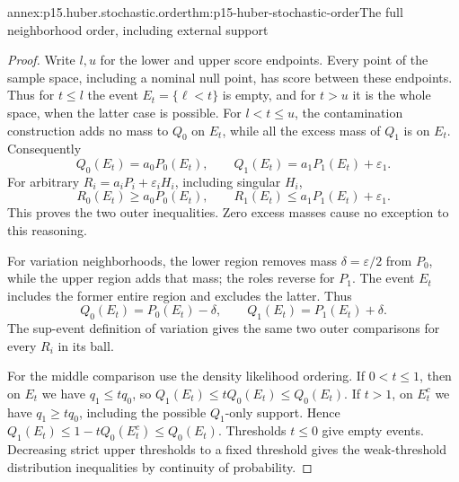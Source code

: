 \begin{annexitem}{annex:p15.huber.stochastic.order}{thm:p15-huber-stochastic-order}{The full neighborhood order, including external support}
\begin{proof}
Write \(l,u\) for the lower and upper score endpoints.
Every point of the sample space, including a nominal null point, has
score between these endpoints. Thus for \(t\leq l\) the event
\(E_t=\{\ell<t\}\) is empty, and for \(t>u\) it is the whole space,
when the latter case is possible.
For \(l<t\leq u\), the contamination construction adds no mass to
\(Q_0\) on \(E_t\), while all the excess mass of \(Q_1\) is on \(E_t\).
Consequently
\[
 Q_0(E_t)=a_0P_0(E_t),\qquad Q_1(E_t)=a_1P_1(E_t)+\varepsilon_1.
\]
For arbitrary \(R_i=a_iP_i+\varepsilon_iH_i\), including singular \(H_i\),
\[
 R_0(E_t)\geq a_0P_0(E_t),\qquad
 R_1(E_t)\leq a_1P_1(E_t)+\varepsilon_1.
\]
This proves the two outer inequalities. Zero excess masses cause no
exception to this reasoning.

For variation neighborhoods, the lower region removes mass
\(\delta=\varepsilon/2\) from \(P_0\), while the upper region adds
that mass; the roles reverse for \(P_1\).
The event \(E_t\) includes the former entire region and excludes the
latter. Thus
\[
 Q_0(E_t)=P_0(E_t)-\delta,\qquad
 Q_1(E_t)=P_1(E_t)+\delta.
\]
The sup-event definition of variation gives the same two outer
comparisons for every \(R_i\) in its ball.

For the middle comparison use the density likelihood ordering.
If \(0<t\leq1\), then on \(E_t\) we have \(q_1\leq tq_0\), so
\(Q_1(E_t)\leq tQ_0(E_t)\leq Q_0(E_t)\).
If \(t>1\), on \(E_t^c\) we have \(q_1\geq tq_0\), including the
possible \(Q_1\)-only support. Hence
\(Q_1(E_t)\leq1-tQ_0(E_t^c)\leq Q_0(E_t)\).
Thresholds \(t\leq0\) give empty events.
Decreasing strict upper thresholds to a fixed threshold gives the
weak-threshold distribution inequalities by continuity of probability.
\end{proof}
\end{annexitem}

